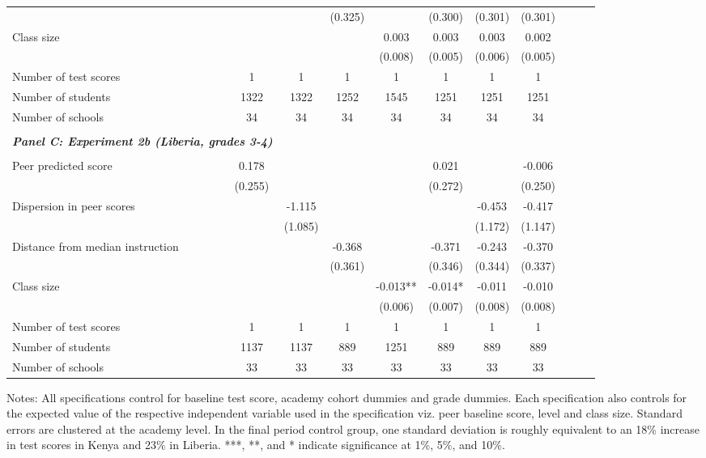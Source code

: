 \begin{center}
\begin{scriptsize}
\begin{threeparttable}
\begin{tabular} {@{} l l c c c c c c c c c c  @{}}
                 &  &  &  & (0.325) &  & (0.300) & (0.301) & (0.301) \\
Class size &  &  &  &  & 0.003 & 0.003 & 0.003 & 0.002 \\
                 &  &  &  &  & (0.008) & (0.005) & (0.006) & (0.005) \\
\midrule
Number of test scores &  & 1 & 1 & 1 & 1 & 1 & 1 & 1 \\
Number of students &  & 1322 & 1322 & 1252 & 1545 & 1251 & 1251 & 1251 \\
Number of schools &  & 34 & 34 & 34 & 34 & 34 & 34 & 34 \\
 \midrule
\\
\multicolumn{3}{l}{\textbf{\textit{Panel C: Experiment 2b (Liberia, grades 3-4)}}} \\
\\
Peer predicted score &  & 0.178 &  &  &  & 0.021 &  & -0.006 \\
                 &  & (0.255) &  &  &  & (0.272) &  & (0.250) \\
Dispersion in peer scores &  &  & -1.115 &  &  &  & -0.453 & -0.417 \\
                 &  &  & (1.085) &  &  &  & (1.172) & (1.147) \\
Distance from median instruction &  &  &  & -0.368 &  & -0.371 & -0.243 & -0.370 \\
                 &  &  &  & (0.361) &  & (0.346) & (0.344) & (0.337) \\
Class size &  &  &  &  & -0.013** & -0.014* & -0.011 & -0.010 \\
                 &  &  &  &  & (0.006) & (0.007) & (0.008) & (0.008) \\
\midrule
Number of test scores &  & 1 & 1 & 1 & 1 & 1 & 1 & 1 \\
Number of students &  & 1137 & 1137 & 889 & 1251 & 889 & 889 & 889 \\
Number of schools &  & 33 & 33 & 33 & 33 & 33 & 33 & 33 \\
\bottomrule
\end{tabular}
\begin{tablenotes}
\item Notes: All specifications control for baseline test score, academy cohort dummies and grade dummies. Each specification also controls for the expected value of the respective independent variable used in the specification viz. peer baseline score, level and class size. Standard errors are clustered at the academy level. In the final period control group, one standard deviation is roughly equivalent to an 18\% increase in test scores in Kenya and 23\% in Liberia. ***, **, and * indicate significance at 1\%, 5\%, and 10\%.\end{tablenotes}
\end{threeparttable}
\end{scriptsize}
\end{center}
\clearpage
